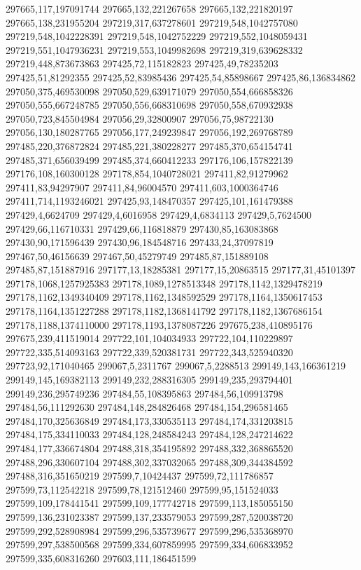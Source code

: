 297665,117,197091744
297665,132,221267658
297665,132,221820197
297665,138,231955204
297219,317,637278601
297219,548,1042757080
297219,548,1042228391
297219,548,1042752229
297219,552,1048059431
297219,551,1047936231
297219,553,1049982698
297219,319,639628332
297219,448,873673863
297425,72,115182823
297425,49,78235203
297425,51,81292355
297425,52,83985436
297425,54,85898667
297425,86,136834862
297050,375,469530098
297050,529,639171079
297050,554,666858326
297050,555,667248785
297050,556,668310698
297050,558,670932938
297050,723,845504984
297056,29,32800907
297056,75,98722130
297056,130,180287765
297056,177,249239847
297056,192,269768789
297485,220,376872824
297485,221,380228277
297485,370,654154741
297485,371,656039499
297485,374,660412233
297176,106,157822139
297176,108,160300128
297178,854,1040728021
297411,82,91279962
297411,83,94297907
297411,84,96004570
297411,603,1000364746
297411,714,1193246021
297425,93,148470357
297425,101,161479388
297429,4,6624709
297429,4,6016958
297429,4,6834113
297429,5,7624500
297429,66,116710331
297429,66,116818879
297430,85,163083868
297430,90,171596439
297430,96,184548716
297433,24,37097819
297467,50,46156639
297467,50,45279749
297485,87,151889108
297485,87,151887916
297177,13,18285381
297177,15,20863515
297177,31,45101397
297178,1068,1257925383
297178,1089,1278513348
297178,1142,1329478219
297178,1162,1349340409
297178,1162,1348592529
297178,1164,1350617453
297178,1164,1351227288
297178,1182,1368141792
297178,1182,1367686154
297178,1188,1374110000
297178,1193,1378087226
297675,238,410895176
297675,239,411519014
297722,101,104034933
297722,104,110229897
297722,335,514093163
297722,339,520381731
297722,343,525940320
297723,92,171040465
299067,5,2311767
299067,5,2288513
299149,143,166361219
299149,145,169382113
299149,232,288316305
299149,235,293794401
299149,236,295749236
297484,55,108395863
297484,56,109913798
297484,56,111292630
297484,148,284826468
297484,154,296581465
297484,170,325636849
297484,173,330535113
297484,174,331203815
297484,175,334110033
297484,128,248584243
297484,128,247214622
297484,177,336674804
297488,318,354195892
297488,332,368865520
297488,296,330607104
297488,302,337032065
297488,309,344384592
297488,316,351650219
297599,7,10424437
297599,72,111786857
297599,73,112542218
297599,78,121512460
297599,95,151524033
297599,109,178441541
297599,109,177742718
297599,113,185055150
297599,136,231023387
297599,137,233579053
297599,287,520038720
297599,292,528908984
297599,296,535739677
297599,296,535368970
297599,297,538500568
297599,334,607859995
297599,334,606833952
297599,335,608316260
297603,111,186451599
